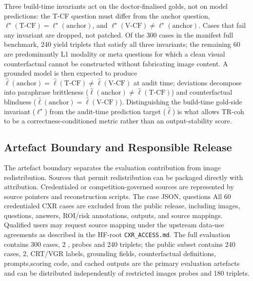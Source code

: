 \documentclass{article}
\providecommand{\DIFaddtex}[1]{{\protect\color{blue} \sf #1}} %
\providecommand{\DIFdeltex}[1]{{\protect\color{red} \scriptsize #1}} %
\providecommand{\DIFaddbegin}{} %
\providecommand{\DIFaddend}{} %
\providecommand{\DIFdelbegin}{} %
\providecommand{\DIFdelend}{} %
\providecommand{\DIFadd}[1]{\texorpdfstring{\DIFaddtex{#1}}{#1}} %
\providecommand{\DIFdel}[1]{\texorpdfstring{\DIFdeltex{#1}}{}} %
\begin{document}
Three build-time invariants act on the doctor-finalised golds, not on model predictions: the T-CF question must differ from the anchor question, $\ell^{\star}(\text{T-CF})=\ell^{\star}(\text{anchor})$, and $\ell^{\star}(\text{V-CF})\neq\ell^{\star}(\text{anchor})$. Cases that fail any invariant are dropped, not patched. Of the 300 cases in the \DIFdelbegin \DIFdel{manifest}\DIFdelend \DIFaddbegin \DIFadd{full benchmark}\DIFaddend , 240 yield triplets that satisfy all three invariants; the remaining 60 are predominantly L1 modality or meta questions for which a clean visual counterfactual cannot be constructed without fabricating image content. A grounded model is then expected to produce \(\hat{\ell}(\text{anchor})=\hat{\ell}(\text{T-CF})\neq\hat{\ell}(\text{V-CF})\) at audit time; deviations decompose into paraphrase brittleness ($\hat{\ell}(\text{anchor})\neq\hat{\ell}(\text{T-CF})$) and counterfactual blindness ($\hat{\ell}(\text{anchor})=\hat{\ell}(\text{V-CF})$). Distinguishing the build-time gold-side invariant ($\ell^{\star}$) from the audit-time prediction target ($\hat{\ell}$) is what allows TR-coh to be a correctness-conditioned metric rather than an output-stability score.

\subsection{Artefact Boundary and Responsible Release}

The artefact boundary separates the evaluation contribution from image redistribution. Sources that permit redistribution can be packaged directly with attribution. \DIFdelbegin \DIFdel{Credentialed or competition-governed sources are represented by source pointers and reconstruction scripts. The case JSON, questions}\DIFdelend \DIFaddbegin \DIFadd{All 60 credentialed CXR cases are excluded from the public release, including images, questions, answers, ROI/risk annotations, outputs, and source mappings. Qualified users may request source mapping under the upstream data-use agreements as described in the HF-root \texttt{CXR\_ACCESS.md}. The full evaluation contains 300 cases, 2}{\DIFadd{,}}\DIFadd{556 probes and 240 triplets; the public subset contains 240 cases, 2}{\DIFaddend ,\DIFdelbegin \DIFdel{CRT/VGR labels, grounding fields, counterfactual definitions, prompts,scoring code, and cached outputs are the primary evaluation artefacts and can be distributed independently of restricted images}\DIFdelend \DIFaddbegin }\DIFadd{002 probes and 180 triplets}\DIFaddend .
\end{document}
